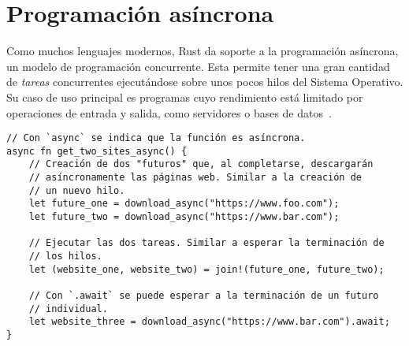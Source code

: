 \section{Programación asíncrona}

Como muchos lenguajes modernos, Rust da soporte a la programación asíncrona, un
modelo de programación concurrente. Esta permite tener una gran cantidad de
\emph{tareas} concurrentes ejecutándose sobre unos pocos hilos del Sistema
Operativo. Su caso de uso principal es programas cuyo rendimiento está limitado
por operaciones de entrada y salida, como servidores o bases de
datos~\cite{rustasyncbook}.

\begin{verbatim}
// Con `async` se indica que la función es asíncrona.
async fn get_two_sites_async() {
    // Creación de dos "futuros" que, al completarse, descargarán
    // asíncronamente las páginas web. Similar a la creación de
    // un nuevo hilo.
    let future_one = download_async("https://www.foo.com");
    let future_two = download_async("https://www.bar.com");

    // Ejecutar las dos tareas. Similar a esperar la terminación de
    // los hilos.
    let (website_one, website_two) = join!(future_one, future_two);

    // Con `.await` se puede esperar a la terminación de un futuro
    // individual.
    let website_three = download_async("https://www.bar.com").await;
}
\end{verbatim}
